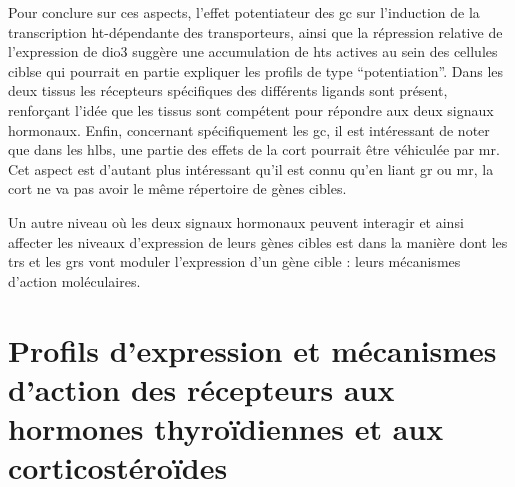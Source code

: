 \documentclass[../main.tex]{subfiles}
\begin{document}
		Pour conclure sur ces aspects, l'effet potentiateur des \gls{gc} sur l'induction de la transcription \gls{ht}-dépendante des transporteurs, ainsi que la répression relative de l'expression de \gls{dio3} suggère une accumulation de \glspl{ht} actives au sein des cellules ciblse qui pourrait en partie expliquer les profils de type ``potentiation''.
		Dans les deux tissus les récepteurs spécifiques des différents ligands sont présent, renforçant l'idée que les tissus sont compétent pour répondre aux deux signaux hormonaux.
		Enfin, concernant spécifiquement les \gls{gc}, il est intéressant de noter que dans les \glspl{hlb}, une partie des effets de la \gls{cort} pourrait être véhiculée par \gls{mr}.
		Cet aspect est d'autant plus intéressant qu'il est connu qu'en liant \gls{gr} ou \gls{mr}, la \gls{cort} ne va pas avoir le même répertoire de gènes cibles.
		\par
		Un autre niveau où les deux signaux hormonaux peuvent interagir et ainsi affecter les niveaux d'expression de leurs gènes cibles est dans la manière dont les \glspl{tr} et les \glspl{gr} vont moduler l'expression d'un gène cible :
		leurs mécanismes d'action moléculaires.


\section{Profils d'expression et mécanismes d'action des récepteurs aux hormones thyroïdiennes et aux corticostéroïdes}
\end{document}
